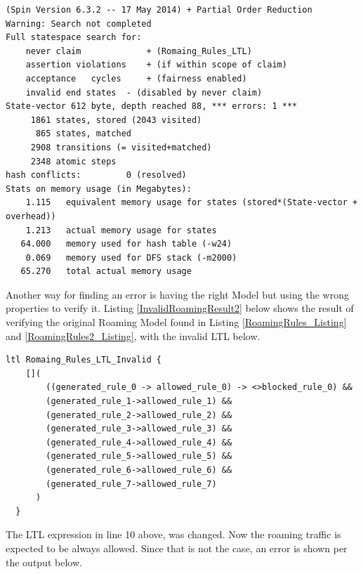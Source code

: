 \singlespacing
\begin{lstlisting}[caption=Invalid Roaming-Rules Plan - Verification ,
  label=InvalidRoamingResult]
(Spin Version 6.3.2 -- 17 May 2014) + Partial Order Reduction
Warning: Search not completed
Full statespace search for:
	never claim         	+ (Romaing_Rules_LTL)
	assertion violations	+ (if within scope of claim)
	acceptance   cycles 	+ (fairness enabled)
	invalid end states	- (disabled by never claim)
State-vector 612 byte, depth reached 88, *** errors: 1 ***
     1861 states, stored (2043 visited)
      865 states, matched
     2908 transitions (= visited+matched)
     2348 atomic steps
hash conflicts:         0 (resolved)
Stats on memory usage (in Megabytes):
    1.115	equivalent memory usage for states (stored*(State-vector + overhead))
    1.213	actual memory usage for states
   64.000	memory used for hash table (-w24)
    0.069	memory used for DFS stack (-m2000)
   65.270	total actual memory usage
\end{lstlisting}
\doublespacing

Another way for finding an error is having the right Model but using the wrong properties to verify it. Listing \ref{InvalidRoamingResult2} below shows the result of verifying the original Roaming Model found in Listing \ref{RoamingRules_Listing} and \ref{RoamingRules2_Listing}, with the invalid LTL below. \\

\singlespacing
\begin{lstlisting}[caption=Roaming-Rules LTL Invalidad,
  label=RoamingLTL]
  ltl Romaing_Rules_LTL_Invalid {
    []( 
        ((generated_rule_0 -> allowed_rule_0) -> <>blocked_rule_0) &&
        (generated_rule_1->allowed_rule_1) &&
        (generated_rule_2->allowed_rule_2) &&
        (generated_rule_3->allowed_rule_3) &&
        (generated_rule_4->allowed_rule_4) &&
        (generated_rule_5->allowed_rule_5) &&
        (generated_rule_6->allowed_rule_6) &&
        (generated_rule_7->allowed_rule_7)
      )
  }
\end{lstlisting}
\doublespacing

The LTL expression in line 10 above, was changed. Now the roaming traffic is expected to be always allowed. Since that is not the case, an error is shown per the output below. 

